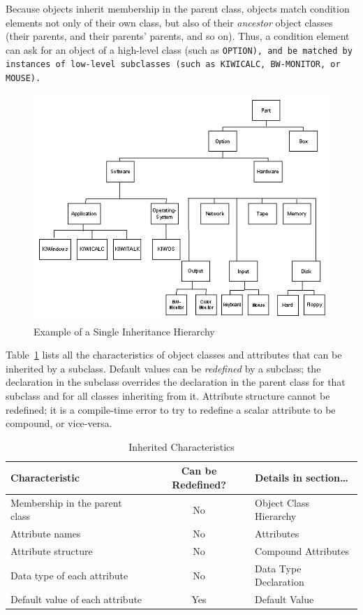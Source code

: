Because objects inherit membership in the parent class, objects match
condition elements not only of their own class, but also of their
\emph{ancestor} object classes (their parents, and their parents'
parents, and so on). Thus, a condition element can ask for an object
of a high-level class (such as \tt{OPTION}), and be matched by
instances of low-level subclasses (such as \tt{KIWICALC},
\tt{BW-MONITOR}, or \tt{MOUSE}).

\begin{figure}[h]
  \centering
  \includegraphics[scale=0.7]{f2-1}
  \caption{Example of a Single Inheritance Hierarchy}
  \label{f:2-1}
\end{figure}

Table~\ref{t:inchar} lists all the characteristics of object classes and
attributes that can be inherited by a subclass. Default
values can be \emph{redefined} by a subclass; the declaration in the
subclass overrides the declaration in the parent class for
that subclass and for all classes inheriting from it.
Attribute structure cannot be redefined; it is a compile-time
error to try to redefine a scalar attribute to be compound,
or vice-versa.
\begin{table}[h]
  \begin{tabularx}{\columnwidth}{Xcl}
    \toprule
    Characteristic              & Can be Redefined?      & Details in section\ldots   \\
    \midrule
    Membership in the parent class    & No          & Object Class Hierarchy \\
    Attribute names             & No          & Attributes   \\
    Attribute structure         & No          & Compound Attributes     \\
    Data type of each attribute & No          & Data Type Declaration    \\
    Default value of each attribute       & Yes         & Default Value \\
    \bottomrule
  \end{tabularx}
  \caption{Inherited Characteristics}
  \label{t:inchar}
\end{table}  

